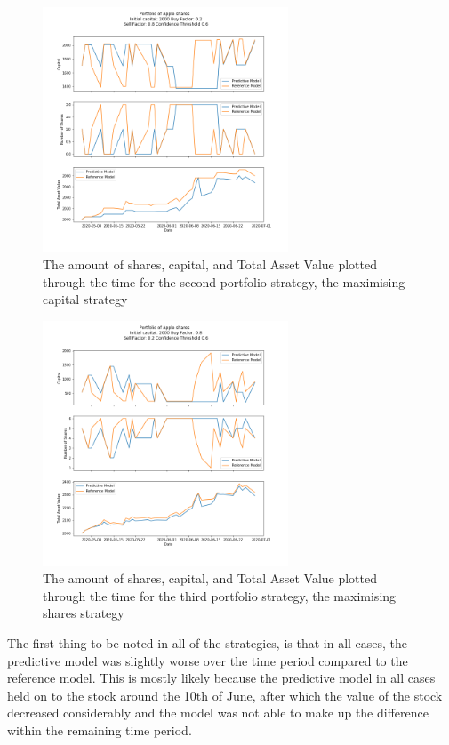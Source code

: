 \begin{figure}[H]
	\centering
	\includegraphics[width=0.65\textwidth]{images/portfolio_2.png}
	\caption{The amount of shares, capital, and Total Asset Value plotted through the time for the second portfolio strategy, the maximising capital strategy}
	\label{fig:port_2}
\end{figure}

\begin{figure}[H]
	\centering
	\includegraphics[width=0.65\textwidth]{images/portfolio_3.png}
	\caption{The amount of shares, capital, and Total Asset Value plotted through the time for the third portfolio strategy, the maximising shares strategy}
	\label{fig:port_3}
\end{figure}

The first thing to be noted in all of the strategies, is that in all cases, the predictive model was slightly worse over the time period compared to the reference model. This is mostly likely because the predictive model in all cases held on to the stock around the 10th of June, after which the value of the stock decreased considerably and the model was not able to make up the difference within the remaining time period. 

